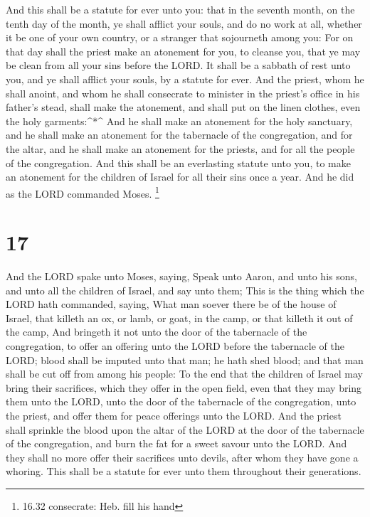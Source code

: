  And this shall be a statute for ever unto you: that in the
seventh month, on the tenth day of the month, ye shall afflict your
souls, and do no work at all, whether it be one of your own country, or
a stranger that sojourneth among you:  For on that day
shall the priest make an atonement for you, to cleanse you, that ye may
be clean from all your sins before the LORD.  It shall be a
sabbath of rest unto you, and ye shall afflict your souls, by a statute
for ever.  And the priest, whom he shall anoint, and whom
he shall consecrate to minister in the priest's office in his father's
stead, shall make the atonement, and shall put on the linen clothes,
even the holy garments:\^{}*\^{}  And he shall make an
atonement for the holy sanctuary, and he shall make an atonement for the
tabernacle of the congregation, and for the altar, and he shall make an
atonement for the priests, and for all the people of the congregation.
 And this shall be an everlasting statute unto you, to make
an atonement for the children of Israel for all their sins once a year.
And he did as the LORD commanded Moses. \footnote{16.32 consecrate: Heb.
  fill his hand}

\hypertarget{section-16}{%
\section{17}\label{section-16}}

 And the LORD spake unto Moses, saying,  Speak
unto Aaron, and unto his sons, and unto all the children of Israel, and
say unto them; This is the thing which the LORD hath commanded, saying,
 What man soever there be of the house of Israel, that
killeth an ox, or lamb, or goat, in the camp, or that killeth it out of
the camp,  And bringeth it not unto the door of the
tabernacle of the congregation, to offer an offering unto the LORD
before the tabernacle of the LORD; blood shall be imputed unto that man;
he hath shed blood; and that man shall be cut off from among his people:
 To the end that the children of Israel may bring their
sacrifices, which they offer in the open field, even that they may bring
them unto the LORD, unto the door of the tabernacle of the congregation,
unto the priest, and offer them for peace offerings unto the LORD.
 And the priest shall sprinkle the blood upon the altar of
the LORD at the door of the tabernacle of the congregation, and burn the
fat for a sweet savour unto the LORD.  And they shall no
more offer their sacrifices unto devils, after whom they have gone a
whoring. This shall be a statute for ever unto them throughout their
generations.

